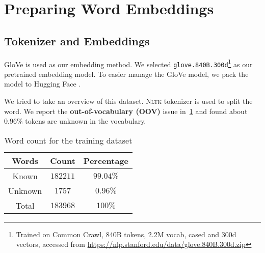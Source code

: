 \section{Preparing Word Embeddings}

\subsection{Tokenizer and Embeddings}

GloVe \cite{pennington2014glove} is used as our embedding method. We selected \texttt{glove.840B.300d}\footnote{Trained on Common Crawl, 840B tokens, 2.2M vocab, cased and 300d vectors, accessed from \url{https://nlp.stanford.edu/data/glove.840B.300d.zip}} as our pretrained embedding model. To easier manage the GloVe model, we pack the model to Hugging Face \cite{wolf2020transformers}.

We tried to take an overview of this dataset. \textsc{Nltk} tokenizer \cite{bird2006nltk} is used to split the word. We report the \textbf{out-of-vocabulary (OOV)} issue in~\cref{tab:word_stats} and found about $0.96\%$ tokens are unknown in the vocabulary.

\begin{table}[ht]
    \centering
    \begin{tabular}{c | c | c}
    \toprule
    \textbf{Words} & \textbf{Count} & \textbf{Percentage}\\
    \midrule
    Known & $182211$ & $99.04\%$\\
    Unknown & $1757$ & $0.96\%$\\
    \midrule
    Total & $183968$ & $100\%$\\
    \bottomrule
    \end{tabular}
    \vspace{1mm}
    \caption{Word count for the training dataset \cite{Pang+Lee:05a}}
    \label{tab:word_stats}
    \vspace{-2mm}
\end{table}





